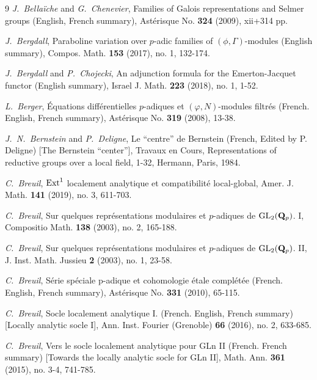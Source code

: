 \documentclass[SecEq,CM,GP]{degruyter-crelle} %
\theoremstyle{plain}
\newcommand{\ext}{{\rm Ext}}
\newcommand{\GLN}{{\rm GL}}
\newcommand{\bQ}{{\mathbf{Q}}}
\begin{document}
\begin{thebibliography}{9}
\textit{J.~Bella\"{i}che} and \textit{G.~Chenevier},
 Families of Galois representations and Selmer groups (English, French summary), Ast\'{e}risque No. \textbf{324} (2009), xii+314 pp. 


\textit{J.~Bergdall},
Paraboline variation over $p$-adic families of $(\phi,\Gamma)$-modules (English summary),
Compos. Math. \textbf{153} (2017), no. 1, 132-174.


\textit{J.~Bergdall} and \textit{P.~Chojecki},
An adjunction formula for the Emerton-Jacquet functor (English summary),
Israel J. Math. \textbf{223} (2018), no. 1, 1-52.


\textit{L.~Berger},
\'{E}quations diff\'{e}rentielles $p$-adiques et $(\varphi,N)$-modules filtr\'{e}s (French. English, French summary),
Ast\'{e}risque No. \textbf{319} (2008), 13-38. 

\textit{J.~N.~Bernstein}   and \textit{P.~Deligne},
{Le ``centre'' de Bernstein (French, Edited by P. Deligne) [The Bernstein ``center'']}, Travaux en Cours, Representations of reductive groups over a local field, 1-32, Hermann, Paris, 1984.


\textit{C.~Breuil},
{$\ext^1$} localement analytique et compatibilit\'{e} local-global, Amer. J. Math. \textbf{141} (2019), no. 3, 611-703.


\textit{C.~Breuil},
Sur quelques repr\'{e}sentations modulaires et {$p$}-adiques de {${\GLN}_2(\bQ_p)$}. {I}, Compositio Math. \textbf{138} (2003), no. 2, 165-188.


\textit{C.~Breuil},
Sur quelques repr\'{e}sentations modulaires et {$p$}-adiques de
	{${\GLN}_2(\bQ_p)$}. {II},
J. Inst. Math. Jussieu \textbf{2} (2003), no. 1, 23-58.


\textit{C.~Breuil}, 
S\'{e}rie sp\'{e}ciale p-adique et cohomologie \'{e}tale compl\'{e}t\'{e}e (French. English, French summary), Ast\'{e}risque  No. \textbf{331} (2010), 65-115. 


\textit{C.~Breuil}, 
Socle localement analytique I. (French. English, French summary) [Locally analytic socle I], Ann. Inst. Fourier (Grenoble) \textbf{66} (2016), no. 2, 633-685.



\textit{C.~Breuil}, 
Vers le socle localement analytique pour GLn II (French. French summary) [Towards the locally analytic socle for GLn II],
Math. Ann. \textbf{361} (2015), no. 3-4, 741-785.



\end{thebibliography}
\end{document}
